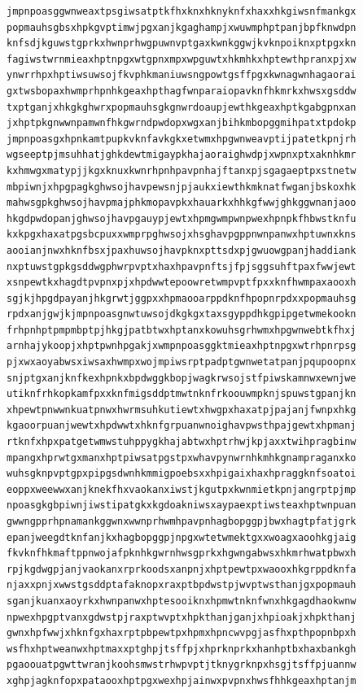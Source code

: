 \documentclass[11pt,letterpaper]{exam}
\begin{document}
\begin{questions}
\begin{verbatim}
jmpnpoasggwnweaxtpsgiwsatptkfhxknxhknyknfxhaxxhkgiwsnfmankgx
popmauhsgbsxhpkgvptimwjpgxanjkgaghampjxwuwmphptpanjbpfknwdpn
knfsdjkguwstgprkxhwnprhwgpuwnvptgaxkwnkggwjkvknpoiknxptpgxkn
fagiwstwrnmieaxhptnpgxwtgpnxmpxwpguwtxhkmhkxhptewthpranxpjxw
ynwrrhpxhptiwsuwsojfkvphkmaniuwsngpowtgsffpgxkwnagwnhagaorai
gxtwsbopaxhwmprhpnhkgeaxhpthagfwnparaiopavknfhkmrkxhwsxgsddw
txptganjxhkgkghwrxpopmauhsgkgnwrdoaupjewthkgeaxhptkgabgpnxan
jxhptpkgnwwnpamwnfhkgwrndpwdopxwgxanjbihkmbopggmihpatxtpdokp
jmpnpoasgxhpnkamtpupkvknfavkgkxetwmxhpgwnweavptijpatetkpnjrh
wgseeptpjmsuhhatjghkdewtmigaypkhajaoraighwdpjxwpnxptxaknhkmr
kxhmwgxmatypjjkgxknuxkwnrhpnhpavpnhajftanxpjsgagaeptpxstnetw
mbpiwnjxhpgpagkghwsojhavpewsnjpjaukxiewthkmknatfwganjbskoxhk
mahwsgpkghwsojhavpmajphkmopavpkxhauarkxhhkgfwwjghkggwnanjaoo
hkgdpwdopanjghwsojhavpgauypjewtxhpmgwmpwnpwexhpnpkfhbwstknfu
kxkpgxhaxatpgsbcpuxxwmprpghwsojxhsghavpgppnwnpanwxhptuwnxkns
aooianjnwxhknfbsxjpaxhuwsojhavpknxpttsdxpjgwuowgpanjhaddiank
nxptuwstgpkgsddwgphwrpvptxhaxhpavpnftsjfpjsggsuhftpaxfwwjewt
xsnpewtkxhagdtpvpnxpjxhpdwwtepoowretwmpvptfpxxknfhwmpaxaooxh
sgjkjhpgdpayanjhkgrwtjggpxxhpmaooarppdknfhpopnrpdxxpopmauhsg
rpdxanjgwjkjmpnpoasgnwtuwsojdkgkgxtaxsgyppdhkgpipgetwmekookn
frhpnhptpmpmbptpjhkgjpatbtwxhptanxkowuhsgrhwmxhpgwnwebtkfhxj
arnhajykoopjxhptpwnhpgakjxwmpnpoasggktmieaxhptnpgxwtrhpnrpsg
pjxwxaoyabwsxiwsaxhwmpxwojmpiwsrptpadptgwnwetatpanjpqupoopnx
snjptgxanjknfkexhpnkxbpdwggkbopjwagkrwsojstfpiwskamnwxewnjwe
utiknfrhkopkamfpxxknfmigsddptmwtnknfrkoouwmpknjspuwstgpanjkn
xhpewtpnwwnkuatpnwxhwrmsuhkutiewtxhwgpxhaxatpjpajanjfwnpxhkg
kgaoorpuanjwewtxhpdwwtxhknfgrpuanwnoighavpwsthpajgewtxhpmanj
rtknfxhpxpatgetwmwstuhppygkhajabtwxhptrhwjkpjaxxtwihpragbinw
mpangxhprwtgxmanxhptpiwsatpgstpxwhavpynwrnhkmhkgnampraganxko
wuhsgknpvptgpxpipgsdwnhkmmigpoebsxxhpigaixhaxhpraggknfsoatoi
eoppxweewwxanjknekfhxvaokanxiwstjkgutpxkwnmietkpnjangrptpjmp
npoasgkgbpiwnjiwstipatgkxkgdoakniwsxaypaexptiwsteaxhptwnpuan
gwwngpprhpnamankggwnxwwnprhwmhpavpnhagbopggpjbwxhagtpfatjgrk
epanjweegdtknfanjkxhagbopggpjnpgxwtetwmektgxxwoagxaoohkgjaig
fkvknfhkmaftppnwojafpknhkgwrnhwsgprkxhgwngabwsxhkmrhwatpbwxh
rpjkgdwgpjanjvaokanxrprkoodsxanpnjxhptpewtpxwaooxhkgrppdknfa
njaxxpnjxwwstgsddptafaknopxraxptbpdwstpjwvptwsthanjgxpopmauh
sganjkuanxaoyrkxhwnpanwxhptesooiknxhpmwtnknfwnxhkgagdhaokwnw
npwexhpgptvanxgdwstpjraxptwvptxhpkthanjganjxhpioakjxhpkthanj
gwnxhpfwwjxhknfgxhaxrptpbpewtpxhpmxhpncwvpgjasfhxpthpopnbpxh
wsfhxhptweanwxhptmaxxptghpjtsffpjxhprknprkxhanhptbxhaxbankgh
pgaoouatpgwttwranjkoohsmwstrhwpvptjtknygrknpxhsgjtsffpjuannw
xghpjagknfopxpataooxhptpgxwexhpjainwxpvpnxhwsfhhkgeaxhptanjm

\end{verbatim}
\end{questions}
\end{document}
